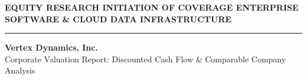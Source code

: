 \thispagestyle{firstpage}

\begin{center}
{\sffamily\small\color{slateink}\bfseries EQUITY RESEARCH \quad\textbullet\quad INITIATION OF COVERAGE \quad\textbullet\quad ENTERPRISE SOFTWARE \& CLOUD DATA INFRASTRUCTURE}\\[4pt]
{\color{vertexteal}\rule{\linewidth}{0.8pt}}
\end{center}

\vspace{4pt}
{\sffamily\Large\bfseries\color{meridiannavy} Vertex Dynamics, Inc.}\\[2pt]
{\sffamily\large\color{slateink} Corporate Valuation Report: Discounted Cash Flow \& Comparable Company Analysis}

